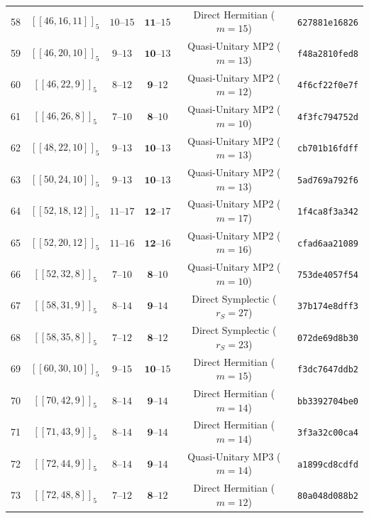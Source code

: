 \documentclass[11pt,a4paper]{article}
\theoremstyle{remark}
\begin{document}
{\begin{longtable}{@{}rccccl@{}}
58 & $[[46,16,11]]_{5}$ & $10\text{--}15$ & $\mathbf{11}\text{--}15$ & Direct Hermitian ($m=15$) & \texttt{627881e16826} \\
59 & $[[46,20,10]]_{5}$ & $9\text{--}13$ & $\mathbf{10}\text{--}13$ & Quasi-Unitary MP2 ($m=13$) & \texttt{f48a2810fed8} \\
60 & $[[46,22,9]]_{5}$ & $8\text{--}12$ & $\mathbf{9}\text{--}12$ & Quasi-Unitary MP2 ($m=12$) & \texttt{4f6cf22f0e7f} \\
61 & $[[46,26,8]]_{5}$ & $7\text{--}10$ & $\mathbf{8}\text{--}10$ & Quasi-Unitary MP2 ($m=10$) & \texttt{4f3fc794752d} \\
62 & $[[48,22,10]]_{5}$ & $9\text{--}13$ & $\mathbf{10}\text{--}13$ & Quasi-Unitary MP2 ($m=13$) & \texttt{cb701b16fdff} \\
63 & $[[50,24,10]]_{5}$ & $9\text{--}13$ & $\mathbf{10}\text{--}13$ & Quasi-Unitary MP2 ($m=13$) & \texttt{5ad769a792f6} \\
64 & $[[52,18,12]]_{5}$ & $11\text{--}17$ & $\mathbf{12}\text{--}17$ & Quasi-Unitary MP2 ($m=17$) & \texttt{1f4ca8f3a342} \\
65 & $[[52,20,12]]_{5}$ & $11\text{--}16$ & $\mathbf{12}\text{--}16$ & Quasi-Unitary MP2 ($m=16$) & \texttt{cfad6aa21089} \\
66 & $[[52,32,8]]_{5}$ & $7\text{--}10$ & $\mathbf{8}\text{--}10$ & Quasi-Unitary MP2 ($m=10$) & \texttt{753de4057f54} \\
67 & $[[58,31,9]]_{5}$ & $8\text{--}14$ & $\mathbf{9}\text{--}14$ & Direct Symplectic ($r_S=27$) & \texttt{37b174e8dff3} \\
68 & $[[58,35,8]]_{5}$ & $7\text{--}12$ & $\mathbf{8}\text{--}12$ & Direct Symplectic ($r_S=23$) & \texttt{072de69d8b30} \\
69 & $[[60,30,10]]_{5}$ & $9\text{--}15$ & $\mathbf{10}\text{--}15$ & Direct Hermitian ($m=15$) & \texttt{f3dc7647ddb2} \\
70 & $[[70,42,9]]_{5}$ & $8\text{--}14$ & $\mathbf{9}\text{--}14$ & Direct Hermitian ($m=14$) & \texttt{bb3392704be0} \\
71 & $[[71,43,9]]_{5}$ & $8\text{--}14$ & $\mathbf{9}\text{--}14$ & Direct Hermitian ($m=14$) & \texttt{3f3a32c00ca4} \\
72 & $[[72,44,9]]_{5}$ & $8\text{--}14$ & $\mathbf{9}\text{--}14$ & Quasi-Unitary MP3 ($m=14$) & \texttt{a1899cd8cdfd} \\
73 & $[[72,48,8]]_{5}$ & $7\text{--}12$ & $\mathbf{8}\text{--}12$ & Direct Hermitian ($m=12$) & \texttt{80a048d088b2} \\

\end{longtable}}
\end{document}
